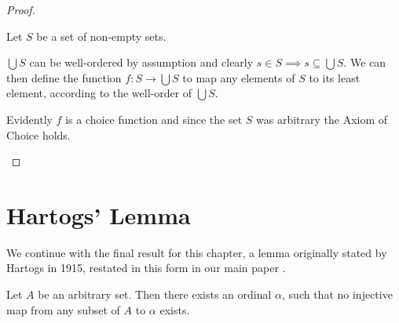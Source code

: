 \documentclass[../../main.tex]{subfiles}
\begin{document}
\begin{proof}
\begin{enumerate}
        Let $S$ be a set of non-empty sets.

        $\bigcup S$ can be well-ordered by assumption and clearly $s \in S \implies s \subseteq \bigcup S$.
        We can then define the function $f: S \to \bigcup S$ to map any elements of $S$ to its least element, according to the well-order of $\bigcup S$.
        
        Evidently $f$ is a choice function and since the set $S$ was arbitrary the Axiom of Choice holds.
    \end{enumerate}
\end{proof}

\section{Hartogs' Lemma}
We continue with the final result for this chapter, 
a lemma originally stated by Hartogs in 1915, restated in this form in our main paper \cite{Haj72}.

\begin{lemma}\cite{Har15}
    Let $A$ be an arbitrary set.
    Then there exists an ordinal $\alpha$, 
    such that no injective map from any subset of $A$ to $\alpha$ exists. %
\end{lemma}
\end{document}
